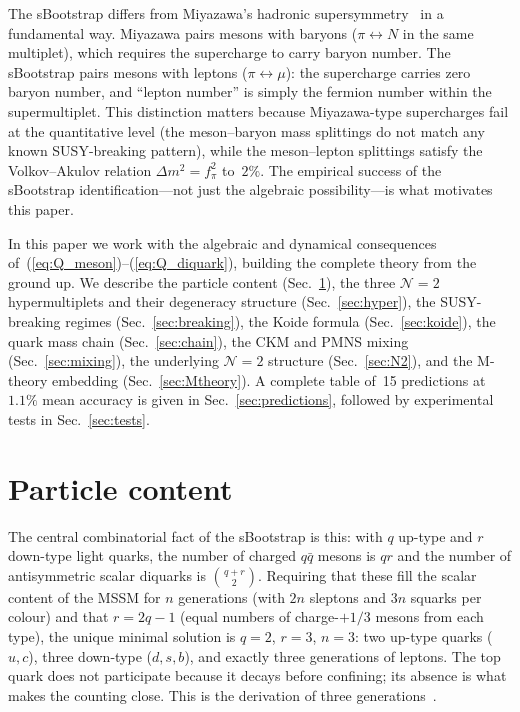 \documentclass[aps,prd,twocolumn,showpacs,preprintnumbers,superscriptaddress]{revtex4-2}
\begin{document}
The sBootstrap differs from Miyazawa's hadronic
supersymmetry~\cite{Miyazawa:1966} in a fundamental way.
Miyazawa pairs mesons with baryons
($\pi \leftrightarrow N$ in the same multiplet),
which requires the supercharge to carry baryon number.
The sBootstrap pairs mesons with leptons
($\pi \leftrightarrow \mu$): the supercharge carries zero
baryon number, and ``lepton number'' is simply the fermion
number within the supermultiplet.
This distinction matters because Miyazawa-type supercharges
fail at the quantitative level (the meson--baryon mass
splittings do not match any known SUSY-breaking pattern),
while the meson--lepton splittings satisfy the Volkov--Akulov
relation $\Delta m^2 = f_\pi^2$ to~$2\%$.
The empirical success of the sBootstrap identification---not
just the algebraic possibility---is what motivates this paper.

In this paper we work with the algebraic and dynamical
consequences of~(\ref{eq:Q_meson})--(\ref{eq:Q_diquark}),
building the complete theory from the ground up.
We describe the particle content (Sec.~\ref{sec:content}),
the three $\mathcal{N}{=}2$ hypermultiplets and their
degeneracy structure (Sec.~\ref{sec:hyper}),
the SUSY-breaking regimes (Sec.~\ref{sec:breaking}),
the Koide formula (Sec.~\ref{sec:koide}),
the quark mass chain (Sec.~\ref{sec:chain}),
the CKM and PMNS mixing (Sec.~\ref{sec:mixing}),
the underlying $\mathcal{N}{=}2$ structure (Sec.~\ref{sec:N2}),
and the M-theory embedding (Sec.~\ref{sec:Mtheory}).
A complete table of~15 predictions at $1.1\%$ mean accuracy
is given in Sec.~\ref{sec:predictions}, followed by
experimental tests in Sec.~\ref{sec:tests}.

\section{Particle content}
\label{sec:content}

The central combinatorial fact of the sBootstrap is this:
with $q$ up-type and $r$ down-type light quarks, the number
of charged $q\bar q$ mesons is $qr$ and the number of
antisymmetric scalar diquarks is $\binom{q+r}{2}$.
Requiring that these fill the scalar content of the MSSM
for $n$ generations (with $2n$ sleptons and $3n$ squarks
per colour) and that $r = 2q-1$ (equal numbers of
charge-$+1/3$ mesons from each type), the unique minimal
solution is $q = 2$, $r = 3$, $n = 3$: two up-type quarks
($u, c$), three down-type ($d, s, b$), and exactly three
generations of leptons.
The top quark does not participate because it decays before
confining; its absence is what makes the counting close.
This is the derivation of three
generations~\cite{Rivero:2024}.
\end{document}
